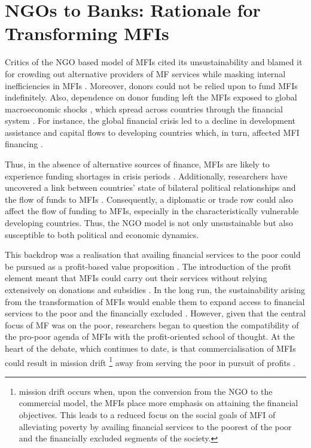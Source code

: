 \documentclass[a4paper, nobind]{templates/ociamthesis}
\begin{document}
\hypertarget{ngos-to-banks-rationale-for-transforming-mfis}{%
\section{NGOs to Banks: Rationale for Transforming MFIs}\label{ngos-to-banks-rationale-for-transforming-mfis}}

\noindent Critics of the NGO based model of MFIs cited its unsustainability and blamed it for crowding out alternative providers of MF services \autocite{kota2007microfinance} while masking internal inefficiencies in MFIs \autocite{caseau2020impact}. Moreover, donors could not be relied upon to fund MFIs indefinitely. Also, dependence on donor funding left the MFIs exposed to global macroeconomic shocks \autocite{d2017ngos}, which spread across countries through the financial system \autocite{schnabl2012international}. For instance, the global financial crisis led to a decline in development assistance and capital flows to developing countries which, in turn, affected MFI financing \autocite{leach2012global,wagner2013vulnerability}.

Thus, in the absence of alternative sources of finance, MFIs are likely to experience funding shortages in crisis periods \autocite{constantinou2011financial}. Additionally, researchers have uncovered a link between countries' state of bilateral political relationships and the flow of funds to MFIs \autocite{garmaise2013cheap}. Consequently, a diplomatic or trade row could also affect the flow of funding to MFIs, especially in the characteristically vulnerable developing countries. Thus, the NGO model is not only unsustainable but also susceptible to both political and economic dynamics.

This backdrop was a realisation that availing financial services to the poor could be pursued as a profit-based value proposition \autocite{rhyne1999microfinance}. The introduction of the profit element meant that MFIs could carry out their services without relying extensively on donations and subsidies \autocite{duvendack2015mis}. In the long run, the sustainability arising from the transformation of MFIs would enable them to expand access to financial services to the poor and the financially excluded \autocite{brown2012microfinance,sarma2011ngo}. However, given that the central focus of MF was on the poor, researchers began to question the compatibility of the pro-poor agenda of MFIs with the profit-oriented school of thought. At the heart of the debate, which continues to date, is that commercialisation of MFIs could result in mission drift \footnote{mission drift occurs when, upon the conversion from the NGO to the commercial model, the MFIs place more emphasis on attaining the financial objectives. This leads to a reduced focus on the social goals of MFI of alleviating poverty by availing financial services to the poorest of the poor and the financially excluded segments of the society.} away from serving the poor in pursuit of profits \autocite{im2015profits,mia2017mission}.
\end{document}
